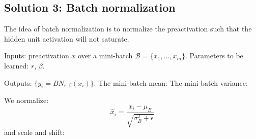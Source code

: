 \documentclass[a4paper,12pt]{article}
\begin{document}
\subsection{Solution 3: Batch normalization}

The idea of batch normalization is to normalize the preactivation such that the hidden unit activation will not saturate. 

Inputs: preactivation $x$ over a mini-batch $\mathcal{B} = \{x_1, ..., x_m\}$. Parameters to be learned: $r$, $\beta$. 

Outputs: $\{y_i = BN_{r,\beta}(x_i)\}$. The mini-batch mean: The mini-batch variance: 

We normalize: 
$$\hat x_i = \frac{x_i - \mu_B}{\sqrt{\sigma_B^T + \epsilon}}$$
and scale and shift: 
\end{document}
